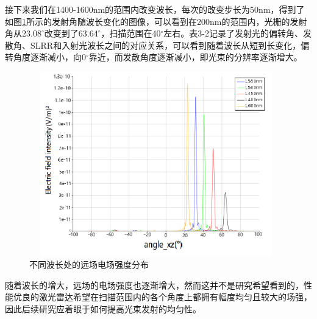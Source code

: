 \documentclass[UTF8,a4paper,12pt]{ctexart}
\numberwithin{equation}{section}
\begin{document}
接下来我们在1400-1600nm的范围内改变波长，每次的改变步长为50nm，得到了如图\ref{3-13}所示的发射角随波长变化的图像，可以看到在200nm的范围内，光栅的发射角从$23.08^\circ$改变到了$63.64^\circ$，扫描范围在40$^\circ$左右。表3-2记录了发射光的偏转角、发散角、SLRR和入射光波长之间的对应关系，可以看到随着波长从短到长变化，偏转角度逐渐减小，向0$^\circ$靠近，而发散角度逐渐减小，即光束的分辨率逐渐增大。
\begin{figure}[htbp]
\centering
\includegraphics[height=8cm,width=11cm]{fig21.png}
\caption{不同波长处的远场电场强度分布}
\label{3-13}
\end{figure}




随着波长的增大，远场的电场强度也逐渐增大，然而这并不是研究希望看到的，性能优良的激光雷达希望在扫描范围内的各个角度上都拥有幅度均匀且较大的场强，因此后续研究应着眼于如何提高光束发射的均匀性。
\end{document}
